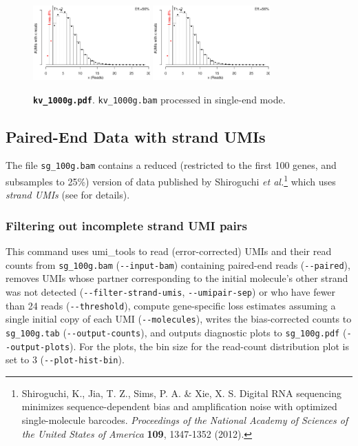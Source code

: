 \documentclass{scrartcl}
\makeatletter
\let\subsection@phlo\subsection
\renewcommand\subsection{\needspace{5\baselineskip}\subsection@phlo}
\newcommand{\shellscript}[1]{\bgroup\topsep=0pt\partopsep=0pt\shaded%
	\endshaded\egroup}
\newcommand{\ddarg}[1]{\texttt{-{}-#1}}
\DeclareRobustCommand*{\nameref}[1]{%
      \textit{\my@nameref{#1}}%
    }%
\makeatother
\begin{document}
\begin{figure}[H]
{\centering
\includegraphics[width=0.4\textwidth,page=1]{../examples/kv_1000g.pdf}\hfill
\includegraphics[width=0.4\textwidth,page=2]{../examples/kv_1000g.pdf}
\\}
\caption*{\textbf{\texttt{kv\_1000g.pdf}}. \texttt{kv\_1000g.bam} processed in single-end mode.}
\end{figure}

\subsection{Paired-End Data with strand UMIs}

The file \texttt{sg\_100g.bam} contains a reduced (restricted to the first 100 genes, and subsamples to 25\%) version of data published by Shiroguchi \textit{et al.}\footnote{Shiroguchi, K., Jia, T. Z., Sims, P. A. \& Xie, X. S. Digital RNA sequencing minimizes sequence-dependent bias and amplification noise with optimized single-molecule barcodes. \textit{Proceedings of the National Academy of Sciences of the United States of America} \textbf{109}, 1347-1352 (2012).} which uses \emph{strand UMIs} (see \nameref{strand-umis} for details).

\subsubsection*{Filtering out incomplete strand UMI pairs}

\shellscript{../examples/sg_100g.cmd}

\begin{sloppypar}
This command uses umi\_tools to read (error-corrected) UMIs and their read counts from \texttt{sg\_100g.bam} (\ddarg{input-bam}) containing paired-end reads (\ddarg{paired}), removes UMIs whose partner corresponding to the initial molecule's other strand was not detected (\ddarg{filter-strand-umis}, \ddarg{umipair-sep}) or who have fewer than 24 reads (\ddarg{threshold}), compute gene-specific loss estimates assuming a single initial copy of each UMI (\ddarg{molecules}), writes the bias-corrected counts to \texttt{sg\_100g.tab} (\ddarg{output-counts}), and outputs diagnostic plots to \texttt{sg\_100g.pdf} (\ddarg{output-plots}). For the plots, the bin size for the read-count distribution plot is set to 3 (\ddarg{plot-hist-bin}).
\end{sloppypar}
\end{document}
